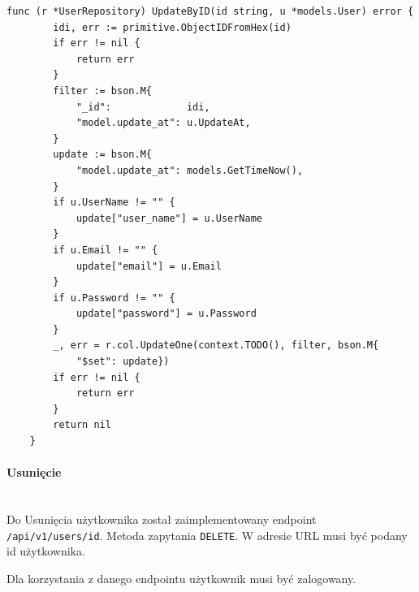 \begin{lstlisting}[label=list:user_repository_UpdateByID,caption=Edycja uzytkownika w bazie danych,basicstyle=\tiny\ttfamily]
    func (r *UserRepository) UpdateByID(id string, u *models.User) error {
        idi, err := primitive.ObjectIDFromHex(id)
        if err != nil {
            return err
        }
        filter := bson.M{
            "_id":             idi,
            "model.update_at": u.UpdateAt,
        }
        update := bson.M{
            "model.update_at": models.GetTimeNow(),
        }
        if u.UserName != "" {
            update["user_name"] = u.UserName
        }
        if u.Email != "" {
            update["email"] = u.Email
        }
        if u.Password != "" {
            update["password"] = u.Password
        }
        _, err = r.col.UpdateOne(context.TODO(), filter, bson.M{
            "$set": update})
        if err != nil {
            return err
        }
        return nil
    }
\end{lstlisting}

\paragraph{Usunięcie}\mbox{}\\

Do Usunięcia użytkownika został zaimplementowany endpoint \texttt{/api/v1/users/{id}}.
Metoda zapytania \texttt{DELETE}.
W adresie URL musi być podany id użytkownika.

Dla korzystania z danego endpointu użytkownik musi być zalogowany.

